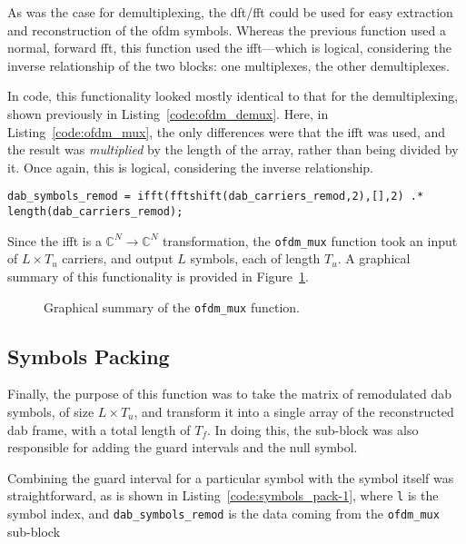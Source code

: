 \documentclass[class=report,11pt,crop=false]{standalone}
\begin{document}
As was the case for demultiplexing, the \gls{dft}/\gls{fft} could be used for easy extraction and reconstruction of the \gls{ofdm} symbols. Whereas the previous function used a normal, forward \gls{fft}, this function used the \gls{ifft}---which is logical, considering the inverse relationship of the two blocks: one multiplexes, the other demultiplexes.

In code, this functionality looked mostly identical to that for the demultiplexing, shown previously in Listing~\ref{code:ofdm_demux}. Here, in Listing~\ref{code:ofdm_mux}, the only differences were that the \gls{ifft} was used, and the result was \emph{multiplied} by the length of the array, rather than being divided by it. Once again, this is logical, considering the inverse relationship.

\begin{lstlisting}[caption={\textsc{Matlab} code for multiplexing an \gls{ofdm} symbol}, label={code:ofdm_mux}]
dab_symbols_remod = ifft(fftshift(dab_carriers_remod,2),[],2) .* length(dab_carriers_remod);
\end{lstlisting}

Since the \gls{ifft} is a \(\mathbb{C}^N \to \mathbb{C}^N\) transformation, the \texttt{ofdm\_mux} function took an input of \(L\times T_u\) carriers, and output \(L\) symbols, each of length \(T_u\). A graphical summary of this functionality is provided in Figure~\ref{fig:ofdm_mux}.

\begin{figure}[htbp]
  \centering
  \captionsetup{type=figure}
  \def\svgwidth{\linewidth}
  { %
  }
  \caption{Graphical summary of the \texttt{ofdm\_mux} function.}
  \label{fig:ofdm_mux}
\end{figure}

\subsection{Symbols Packing \label{subsect:dab-proc_symbols-pack}}
Finally, the purpose of this function was to take the matrix of remodulated \gls{dab} symbols, of size \(L \times T_u\), and transform it into a single array of the reconstructed \gls{dab} frame, with a total length of \(T_f\). In doing this, the sub-block was also responsible for adding the guard intervals and the null symbol.

Combining the guard interval for a particular symbol with the symbol itself was straightforward, as is shown in Listing~\ref{code:symbols_pack-1}, where \texttt{l} is the symbol index, and \texttt{dab\_symbols\_remod} is the data coming from the \texttt{ofdm\_mux} sub-block
\end{document}
